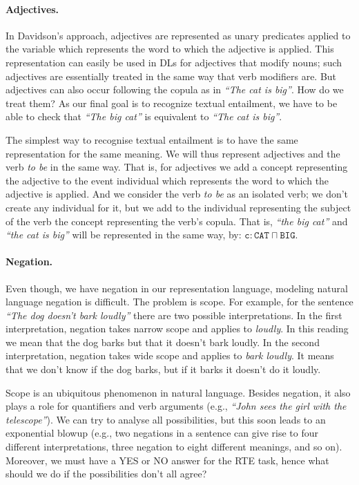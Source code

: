 \documentclass{esslli}
\newcommand{\dl}[1]{\texttt{#1}}
\newcommand{\dd}{{:}}
\begin{document}
\paragraph{Adjectives.}
In Davidson's approach, adjectives are represented as unary predicates applied to the variable which represents the word to
which the adjective is applied. This representation can easily be
used in DLs for adjectives that modify nouns; such adjectives are
essentially treated in the same way that verb modifiers are. But
adjectives can also occur following the copula as in \emph{``The cat
  is big''}. How do we treat them? As our final goal is to recognize
textual entailment, we have to be able to check that \emph{``The
  big cat''} is equivalent to \emph{``The cat is big''}.


The simplest way to recognise textual entailment is to have the same
representation for the same meaning. We will thus represent adjectives
and the verb \emph{to be} in the same way. That is, for adjectives we add
a concept representing the adjective to the event individual which
represents the word to which the adjective is applied. And we consider
the verb \emph{to be} as an isolated verb; we don't create any individual
for it, but we add to the individual representing the subject of the
verb the concept representing the verb's copula. That is, \emph{``the
  big cat''} and \emph{``the cat is big''} will be represented in the
same way, by: $\dl{c} \dd \dl{CAT} \sqcap \dl{BIG}$.

\paragraph{Negation.}
Even though, we have negation in our representation
language, modeling natural language negation is difficult. The
problem is scope. For example, for the sentence \emph{``The dog
  doesn't bark loudly''} there are two possible interpretations. In
the first interpretation, negation takes narrow scope and applies to
\emph{loudly}. In this reading we mean that the dog barks but
that it doesn't bark loudly. In the second interpretation, negation
takes wide scope and applies to \emph{bark loudly}. It means that we
don't know if the dog barks, but if it barks it doesn't do it loudly.

Scope is an ubiquitous phenomenon in natural language. Besides
negation, it also plays a role for quantifiers and verb arguments
(e.g., \emph{``John sees the girl with the telescope''}). We can try
to analyse all possibilities, but this soon leads to an exponential
blowup (e.g., two negations in a sentence can give rise to four different
interpretations, three negation to eight different meanings, and so
on). Moreover, we must have a YES or NO answer for the RTE task, hence
what should we do if the possibilities don't all agree?
\end{document}
